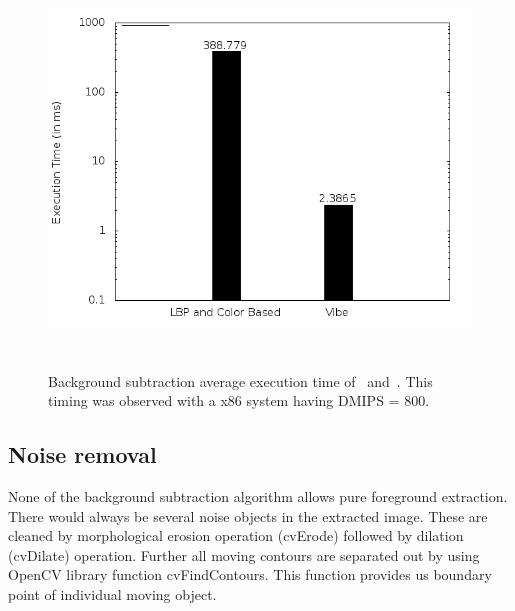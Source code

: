 \begin{figure}[!t]
\centering
\includegraphics[height=300pt]{Figures/bg_compare}
\caption{Background subtraction average execution time of~\cite{11}
and~\cite{9}. This timing was observed with a x86 system having DMIPS =
800.}
\label{bg_compare}
\end{figure}
\subsection{Noise removal}
\indent None of the background subtraction algorithm allows pure
foreground extraction. There would always be several noise objects in the
extracted image. These are cleaned by morphological erosion operation
(cvErode) followed by dilation (cvDilate) operation. Further all moving
contours are separated out by using OpenCV library function
cvFindContours. This function provides us boundary point of individual
moving object.
